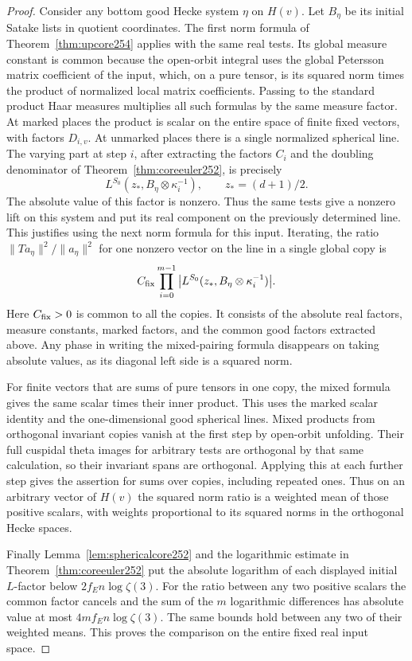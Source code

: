 \documentclass[a4paper,11pt]{article}
\theoremstyle{definition}
\theoremstyle{remark}
\numberwithin{equation}{section}
\begin{document}
\begin{proof}
Consider any bottom good Hecke system \(\eta\) on \(H(v)\).
Let \(B_\eta\) be its initial Satake lists in quotient
coordinates. The first norm formula of
Theorem~\ref{thm:upcore254} applies with the same real tests.
Its global measure constant is common because the open-orbit integral
uses the global Petersson matrix coefficient of the input,
which, on a pure tensor, is its squared norm times the product
of normalized local matrix coefficients. Passing to the
standard product Haar measures multiplies all such formulas
by the same measure factor. At marked places the product is
scalar on the entire space of finite fixed vectors, with
factors \(D_{i,v}\). At unmarked places there is a single
normalized spherical line. The varying part at step \(i\),
after extracting the factors \(C_i\) and the doubling
denominator of Theorem~\ref{thm:coreeuler252}, is precisely
\[
      L^{S_0}(z_*,B_\eta\otimes\kappa_i^{-1}),\qquad
                                  z_*=(d+1)/2 .
\]
The absolute value of this factor is nonzero. Thus the same
tests give a nonzero lift on this system and put its real
component on the previously determined line. This justifies
using the next norm formula for this input. Iterating, the
ratio \(\|Ta_\eta\|^2/\|a_\eta\|^2\) for one nonzero vector
on the line in a single global copy is
\[
       C_{\rm fix}\prod_{i=0}^{m-1}
            \big|L^{S_0}(z_*,B_\eta\otimes\kappa_i^{-1})\big| .
\]
Here \(C_{\rm fix}>0\) is common to all the copies. It consists
of the absolute real factors, measure constants, marked factors,
and the common good factors extracted above. Any phase in
writing the mixed-pairing formula disappears on taking absolute
values, as its diagonal left side is a squared norm.

For finite vectors that are sums of pure tensors in one copy,
the mixed formula gives the same scalar times their inner
product. This uses the marked scalar identity and the
one-dimensional good spherical lines. Mixed products from
orthogonal invariant copies vanish at the first step by
open-orbit unfolding. Their full cuspidal theta images for
arbitrary tests are orthogonal by that same calculation,
so their invariant spans are orthogonal. Applying this at
each further step gives the assertion for sums over copies,
including repeated ones. Thus on an arbitrary vector of \(H(v)\)
the squared norm ratio is a weighted mean of those positive
scalars, with weights proportional to its squared norms in the
orthogonal Hecke spaces.

Finally Lemma~\ref{lem:sphericalcore252} and the logarithmic
estimate in Theorem~\ref{thm:coreeuler252} put the absolute
logarithm of each displayed initial \(L\)-factor below
\(2 f_E n\log\zeta(3)\). For the ratio between any two
positive scalars the common factor cancels and the sum of the
\(m\) logarithmic differences has absolute value at most
\(4m f_E n\log\zeta(3)\). The same bounds hold between any
two of their weighted means. This proves the comparison on
the entire fixed real input space.
\end{proof}
\end{document}
